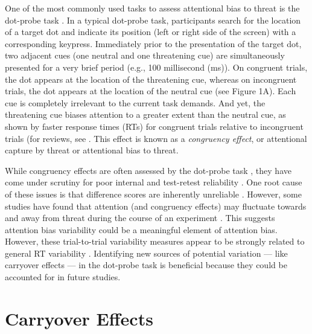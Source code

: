 \documentclass[issue,twocolumn,empirical, authordate,10pt]{jote-new-article}
\begin{document}
One of the most commonly used tasks to assess attentional bias to threat is the dot-probe task \parencite{MacLeod1986}. In a typical dot-probe task, participants search for the location of a target dot and indicate its position (left or right side of the screen) with a corresponding keypress. Immediately prior to the presentation of the target dot, two adjacent cues (one neutral and one threatening cue) are simultaneously presented for a very brief period (e.g., 100 millisecond (ms)). On congruent trials, the dot appears at the location of the threatening cue, whereas on incongruent trials, the dot appears at the location of the neutral cue (see Figure 1A). Each cue is completely irrelevant to the current task demands. And yet, the threatening cue biases attention to a greater extent than the neutral cue, as shown by faster response times (RTs) for congruent trials relative to incongruent trials (for reviews, see \parencite{Carretié2014, Imhoff2019}. This effect is known as a \emph{congruency effect}, or attentional capture by threat or attentional bias to threat.

While congruency effects are often assessed by the dot-probe task \parencite{Kruijt2018, Mogg2017}, they have come under scrutiny for poor internal and test-retest reliability \parencite{Schmukle2005, Staugaard2009}. One root cause of these issues is that difference scores are inherently unreliable \parencite[for an explanation, see][]{Hedge2018}. However, some studies have found that attention (and congruency effects) may fluctuate towards and away from threat during the course of an experiment \parencite{Zvielli2015}. This suggests attention bias variability could be a meaningful element of attention bias. However, these trial-to-trial variability measures appear to be strongly related to general RT variability \parencite{Carlson2020, Kruijt2016}. Identifying new sources of potential variation — like carryover effects — in the dot-probe task is beneficial because they could be accounted for in future studies.




\section{Carryover Effects}
\end{document}
